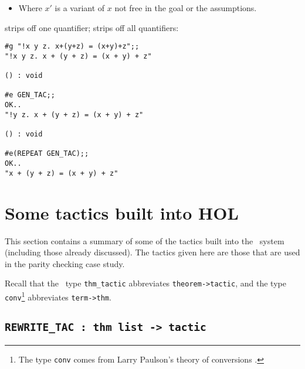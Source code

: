 \begin{itemize}
\item Where $x'$ is a variant of $x$
not free in the goal or the assumptions.
\end{itemize}

\noindent {} strips off one quantifier;
 strips off all quantifiers:

\begin{session}\begin{verbatim}
#g "!x y z. x+(y+z) = (x+y)+z";;
"!x y z. x + (y + z) = (x + y) + z"

() : void

#e GEN_TAC;;
OK..
"!y z. x + (y + z) = (x + y) + z"

() : void

#e(REPEAT GEN_TAC);;
OK..
"x + (y + z) = (x + y) + z"
\end{verbatim}\end{session}


\section{Some tactics built into HOL}

This section contains a summary of some of the tactics built into the \HOL\ system
(including those already discussed).
The tactics given here are those that are used in the parity checking case
study.

Recall that the \ML\ type {\small\verb|thm_tactic|} abbreviates {\small\verb|theorem->tactic|},
and the type {\small\verb|conv|}\footnote{The type
{\small{\tt conv}} comes from Larry Paulson's theory of conversions
\cite{lcp_rewrite}.} abbreviates {\small\verb|term->thm|}.

\subsection{\tt REWRITE\_TAC : thm list -> tactic}
\label{rewrite}

